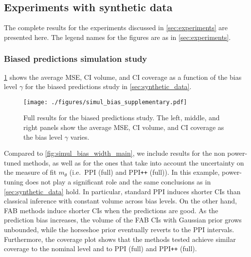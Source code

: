 \subsection{Experiments with synthetic data}
The complete results for the experiments discussed in \cref{sec:experiments} are presented here. The legend names for the figures are as in \cref{sec:experiments}.

\subsubsection{Biased predictions simulation study}\label{app:simul_bias_supplementary}
\cref{fig:simul_bias_supplementary} shows the average MSE, CI volume, and CI coverage as a function of the bias level $\gamma$ for the biased predictions study in \cref{sec:synthetic_data}.
\begin{figure}[ht!]
    \centering
    \texttt{[image: ./figures/simul\_bias\_supplementary.pdf]}
    \caption{Full results for the biased predictions study. The left, middle, and right panels show the average MSE, CI volume, and CI coverage as the bias level $\gamma$ varies.}
    \label{fig:simul_bias_supplementary}
\end{figure}
Compared to \cref{fig:simul_bias_width_main}, we include results for the non power-tuned methods, as well as for the ones that take into account the uncertainty on the measure of fit $m_\theta$ (i.e.~PPI (full) and PPI\texttt{++} (full)). In this example, power-tuning does not play a significant role and the same conclusions as in \cref{sec:synthetic_data} hold. In particular, standard PPI induces shorter CIs than classical inference with constant volume across bias levels. On the other hand, FAB methods induce shorter CIs when the predictions are good. As the prediction bias increases, the volume of the FAB CIs with Gaussian prior grows unbounded, while the horseshoe prior eventually reverts to the PPI intervals. Furthermore, the coverage plot shows that the methods tested achieve similar coverage to the nominal level and to PPI (full) and PPI\texttt{++} (full).


